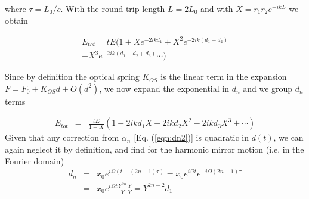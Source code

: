 where $\tau=L_0/c$.
With the round trip length $L=2L_0$ and with $X=r_1r_2 e^{-ikL}$ we obtain





\begin{align}
E_{tot}=tE(1+Xe^{-2ikd_1} +X^2e^{-2ik(d_1+d_2)}\nonumber\\
+X^3e^{-2ik(d_1+d_2+d_3)} \cdots )\nonumber
\end{align}

Since by definition the optical spring $K_{OS}$ is the linear term in the expansion $F=F_0+ K_{OS} d + O(d^2)$, we now expand the exponential in $d_n$ and we group $d_n$ terms %

\begin{align}
E_{tot}&=&\frac{tE}{1-X}(1-2ikd_1 X-2ikd_2 X^2-2ikd_3 X^3+\cdots) \nonumber
\end{align}
Given that any correction from $\alpha_n$ [Eq. (\ref{eqn:dn2})] is quadratic in $d(t)$, we can again neglect it by definition, and find for the harmonic mirror motion (i.e. in the Fourier domain)
\begin{align}
d_n&=&x_0e^{i\Omega(t-(2n-1)\tau)}=x_0e^{i\Omega t}e^{-i\Omega(2n-1)\tau}\nonumber\\
&=&x_0e^{i\Omega t} \frac{Y^{2n}}{Y}\frac{Y}{Y}=Y^{2n-2}d_1
\end{align}

